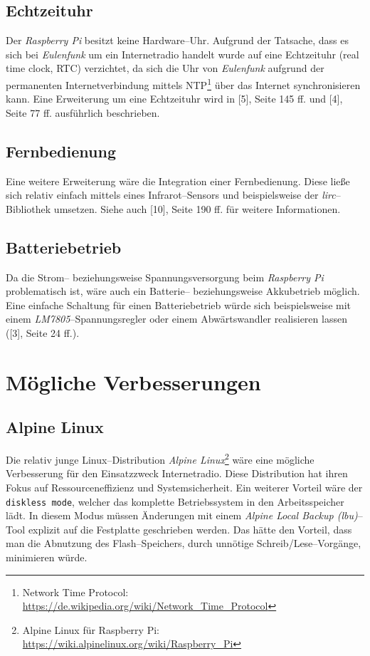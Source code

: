 \documentclass[11pt,ngerman,toc=listof,index=totoc]{scrreprt}
\begin{document}
\subsection{Echtzeituhr}\label{echtzeituhr}

Der \emph{Raspberry Pi} besitzt keine Hardware--Uhr. Aufgrund der
Tatsache, dass es sich bei \emph{Eulenfunk} um ein Internetradio handelt
wurde auf eine Echtzeituhr (real time clock, RTC) verzichtet, da sich
die Uhr von \emph{Eulenfunk} aufgrund der permanenten Internetverbindung
mittels NTP\footnote{Network Time Protocol:
  \url{https://de.wikipedia.org/wiki/Network_Time_Protocol}} über das
Internet synchronisieren kann. Eine Erweiterung um eine Echtzeituhr wird
in {[}5{]}, Seite 145 ff. und {[}4{]}, Seite 77 ff. ausführlich
beschrieben.

\subsection{Fernbedienung}\label{fernbedienung}

Eine weitere Erweiterung wäre die Integration einer Fernbedienung. Diese
ließe sich relativ einfach mittels eines Infrarot--Sensors und
beispielsweise der \emph{lirc}--Bibliothek umsetzen. Siehe auch
{[}10{]}, Seite 190 ff. für weitere Informationen.

\subsection{Batteriebetrieb}\label{batteriebetrieb}

Da die Strom-- beziehungsweise Spannungsversorgung beim \emph{Raspberry
Pi} problematisch ist, wäre auch ein Batterie-- beziehungsweise
Akkubetrieb möglich. Eine einfache Schaltung für einen Batteriebetrieb
würde sich beispielsweise mit einem \emph{LM7805}--Spannungsregler oder
einem Abwärtswandler realisieren lassen ({[}3{]}, Seite 24 ff.).

\section{Mögliche Verbesserungen}\label{muxf6gliche-verbesserungen}

\subsection{Alpine Linux}\label{alpine-linux}

Die relativ junge Linux--Distribution \emph{Alpine Linux}\footnote{Alpine
  Linux für Raspberry Pi:
  \url{https://wiki.alpinelinux.org/wiki/Raspberry_Pi}} wäre eine
mögliche Verbesserung für den Einsatzzweck Internetradio. Diese
Distribution hat ihren Fokus auf Ressourceneffizienz und
Systemsicherheit. Ein weiterer Vorteil wäre der \texttt{diskless\ mode},
welcher das komplette Betriebssystem in den Arbeitsspeicher lädt. In
diesem Modus müssen Änderungen mit einem \emph{Alpine Local Backup
(lbu)}--Tool explizit auf die Festplatte geschrieben werden. Das hätte
den Vorteil, dass man die Abnutzung des Flash--Speichers, durch unnötige
Schreib/Lese--Vorgänge, minimieren würde.
\end{document}
